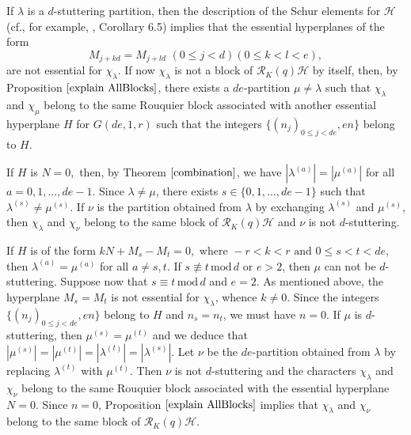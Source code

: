 \documentclass[10pt,a4paper,titlepage]{article}
\newcommand{\el}{\lambda}
\begin{document}
\begin{apod}
{If $\el$ is a $d$-stuttering partition, then the description of the Schur elements for $\mathcal{H}$
(cf., for example, \cite{Mat}, Corollary 6.5)  implies that  the essential hyperplanes of the form 
$$M_{j+kd}=M_{j+ld} \,\,(0 \leq j < d) (0 \leq k<l < e),$$
are not essential for $\chi_\el$. If now $\chi_\el$ is not a block of $\mathcal{R}_K(q)\mathcal{H}$ by itself, then, by Proposition $\ref{explain AllBlocks}$, there exists a $de$-partition $\mu \neq \el$ such that $\chi_\el$ and $\chi_\mu$ belong to the same Rouquier block associated with another essential hyperplane $H$ for $G(de,1,r)$ such that the integers $\{(n_j)_{0 \leq j < de}, en\}$ belong to $H$.

If $H$ is $N=0,$ then, by Theorem $\ref{combination}$, we have $|\el^{(a)}|=|\mu^{(a)}|$ for all $a=0,1,\ldots,de-1$. Since 
$\el \neq \mu$, there exists $s \in \{0,1,\ldots,de-1\}$ such that $ \el^{(s)} \neq \mu^{(s)}$. If  $\nu$ is the partition obtained from $\el$ by exchanging $\el^{(s)}$ and $\mu^{(s)}$, then $\chi_\el$ and $\chi_{\nu}$ belong to the same block of $\mathcal{R}_K(q)\mathcal{H}$ and $\nu$ is not $d$-stuttering. 


If $H$ is of the form 
$kN+M_s-M_t=0, \textrm{ where } -r<k<r \textrm{ and } 0 \leq s<t<de$, then
$\el^{(a)}=\mu^{(a)}$  for all $a \neq s,t$. If $s \not\equiv t \,\mathrm{ mod }\,d$ or $e>2$, then
$\mu$ can not be $d$-stuttering. Suppose now that $s \equiv t \,\mathrm{ mod }\,d$ and $e=2$. 
As mentioned above, 
 the hyperplane $M_s=M_t$ is not essential for $\chi_\el$, whence $k \neq 0$. 
Since the integers $\{(n_j)_{0 \leq j < de}, en\}$ belong to $H$ and $n_s=n_t$, we must have $n=0$.
If $\mu$ is $d$-stuttering, then $\mu^{(s)}=\mu^{(t)}$ and we deduce that $|\mu^{(s)}|=|\mu^{(t)}|=|\el^{(t)}|=|\el^{(s)}|$.
Let $\nu$ be the $de$-partition obtained from $\el$ by replacing $\el^{(t)}$ with $\mu^{(t)}$. Then $\nu$ is not $d$-stuttering and the characters $\chi_\el$ and $\chi_{\nu}$ belong to the same Rouquier block associated with the essential hyperplane $N=0$. Since $n=0$,  Proposition $\ref{explain AllBlocks}$ implies that  $\chi_\el$ and $\chi_{\nu}$ belong to the same block of $\mathcal{R}_K(q)\mathcal{H}$.}
\end{apod}
\end{document}
